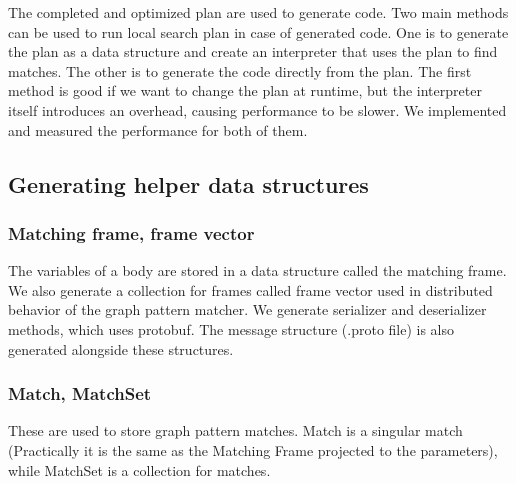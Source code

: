 The completed and optimized plan are used to generate \cpp{} code. 
Two main methods can be used to run local search plan in case of generated code. 
One is to generate the plan as a data structure and create an interpreter that uses the plan to find matches. 
The other is to generate the code directly from the plan. 
The first method is good if we want to change the plan at runtime, but the interpreter itself introduces an overhead, causing performance to be slower.
We implemented and measured the performance for both of them.



\subsection{Generating helper data structures}

\subsubsection{Matching frame, frame vector}

The variables of a body are stored in a data structure called the matching frame.
We also generate a collection for frames called frame vector used in distributed behavior of the graph pattern matcher.
We generate serializer and deserializer methods, which uses protobuf.
The message structure (.proto file) is also generated alongside these structures.

\subsubsection{Match, MatchSet}

These are used to store graph pattern matches. Match is a singular match (Practically it is the same as the Matching Frame projected to the parameters), while MatchSet is a collection for matches.













